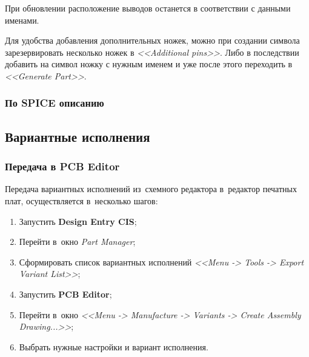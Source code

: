 	\begin{figure}[H]
	\end{figure}

При обновлении расположение выводов останется в соответствии с данными именами. 

Для удобства добавления дополнительных ножек, можно при создании символа зарезервировать несколько ножек в \textit{<<Additional pins>>}. Либо в последствии добавить на символ ножку с нужным именем и уже после этого переходить в \textit{<<Generate Part>>}. 

\subsubsection{По SPICE описанию} \label{sssec:create_symbol_spice}



\newpage
\subsection{Вариантные исполнения} \label{ssec:variant_list}



\subsubsection{Передача в PCB Editor} \label{sssec:export_variant_list}

Передача вариантных исполнений из~схемного редактора в~редактор печатных плат, осуществляется в~несколько шагов:
\begin{enumerate}
	\item Запустить \textbf{Design Entry CIS};
	
	\item Перейти в~окно \textit{Part Manager};
	
	\item Сформировать список вариантных исполнений \textit{<<Menu -> Tools -> Export Variant List>>}; 
	
	\item Запустить \textbf{PCB Editor};
	
	\item Перейти в~окно \textit{<<Menu -> Manufacture -> Variants -> Create Assembly Drawing...>>};
	
	\item Выбрать нужные настройки и вариант исполнения.
	
		\begin{figure}[H]
		\end{figure}	
	
\end{enumerate}

